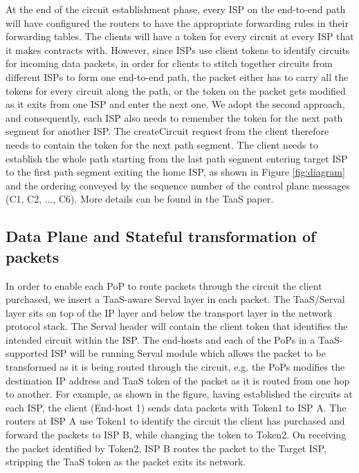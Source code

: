 \documentclass{article}
\begin{document}
At the end of the circuit establishment phase, every ISP on the
end-to-end path will have configured the routers to have the
appropriate forwarding rules in their forwarding tables. The clients
will have a token for every circuit at every ISP that it makes
contracts with. However, since ISPs use client tokens to identify
circuits for incoming data packets, in order for clients to stitch
together circuits from different ISPs to form one end-to-end path, the
packet either has to carry all the tokens for every circuit along the
path, or the token on the packet gets modified as it exits from one
ISP and enter the next one. We adopt the second approach, and
consequently, each ISP also needs to remember the token for the next
path segment for another ISP. The createCircuit request from the
client therefore needs to contain the token for the next path
segment. The client needs to establish the whole path starting from
the last path segment entering target ISP to the first path segment
exiting the home ISP, as shown in Figure \ref{fig:diagram} and the
ordering conveyed by the sequence number of the control plane messages
(C1, C2, ..., C6). More details can be found in the TaaS paper.

\subsection{Data Plane and Stateful transformation of packets}

In order to enable each PoP to route packets through the circuit the
client purchased, we insert a TaaS-aware Serval layer in each
packet. The TaaS/Serval layer sits on top of the IP layer and below
the transport layer in the network protocol stack. The Serval header
will contain the client token that identifies the intended circuit
within the ISP. The end-hosts and each of the PoPs in a TaaS-supported
ISP will be running Serval module which allows the packet to be
transformed as it is being routed through the circuit, e.g. the PoPs
modifies the destination IP address and TaaS token of the packet as it
is routed from one hop to another. For example, as shown in the
figure, having established the circuits at each ISP, the client
(End-host 1) sends data packets with Token1 to ISP A. The routers at
ISP A use Token1 to identify the circuit the client has purchased and
forward the packets to ISP B, while changing the token to Token2. On
receiving the packet identified by Token2, ISP B routes the packet to
the Target ISP, stripping the TaaS token as the packet exits its
network.
\end{document}
